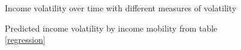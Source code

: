 \documentclass[12pt]{article}
\begin{document}
\begin{figure}[htp!]
\centering
\caption{Income volatility over time with different measures of volatility} 
\centering
{}
\label{volatility_graph}
\end{figure}

\begin{figure}[htp!]
\centering
\caption{Predicted income volatility by income mobility from table \ref{regression}} 
\centering
{}
\label{margins_mobility}
\end{figure}
\end{document}

